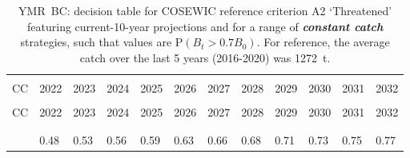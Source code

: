 \documentclass[11pt]{book}
\newcommand{\itbf}[1]{\textit{\textbf{#1}}}
\begin{document}
\begin{longtable}[c]{>{\raggedright\let\newline\\\arraybackslash\hspace{0pt}}p{0.5in}>{\raggedleft\let\newline\\\arraybackslash\hspace{0pt}}p{0.5in}>{\raggedleft\let\newline\\\arraybackslash\hspace{0pt}}p{0.5in}>{\raggedleft\let\newline\\\arraybackslash\hspace{0pt}}p{0.5in}>{\raggedleft\let\newline\\\arraybackslash\hspace{0pt}}p{0.5in}>{\raggedleft\let\newline\\\arraybackslash\hspace{0pt}}p{0.5in}>{\raggedleft\let\newline\\\arraybackslash\hspace{0pt}}p{0.5in}>{\raggedleft\let\newline\\\arraybackslash\hspace{0pt}}p{0.5in}>{\raggedleft\let\newline\\\arraybackslash\hspace{0pt}}p{0.5in}>{\raggedleft\let\newline\\\arraybackslash\hspace{0pt}}p{0.5in}>{\raggedleft\let\newline\\\arraybackslash\hspace{0pt}}p{0.5in}>{\raggedleft\let\newline\\\arraybackslash\hspace{0pt}}p{0.5in}}
  \caption{YMR~BC: decision table for COSEWIC reference criterion A2 `Threatened' featuring current-10-year projections and for a range of \itbf{constant catch} strategies, such that values are P$(B_t > 0.7 B_0)$. For reference, the average catch over the last 5 years (2016-2020) was 1272~t. } \label{tab:ymr.cosewic.70B0.CCs}\\  \hline\\[-2.2ex]  CC  & 2022 & 2023 & 2024 & 2025 & 2026 & 2027 & 2028 & 2029 & 2030 & 2031 & 2032 \\[0.2ex]\hline\\[-1.5ex]  \endfirsthead   \hline  CC  & 2022 & 2023 & 2024 & 2025 & 2026 & 2027 & 2028 & 2029 & 2030 & 2031 & 2032 \\[0.2ex]\hline\\[-1.5ex]  \endhead  \hline\\[-2.2ex]   \endfoot  \hline \endlastfoot  0 & 0.48 & 0.53 & 0.56 & 0.59 & 0.63 & 0.66 & 0.68 & 0.71 & 0.73 & 0.75 & 0.77 \\ 

\end{longtable}
\end{document}
